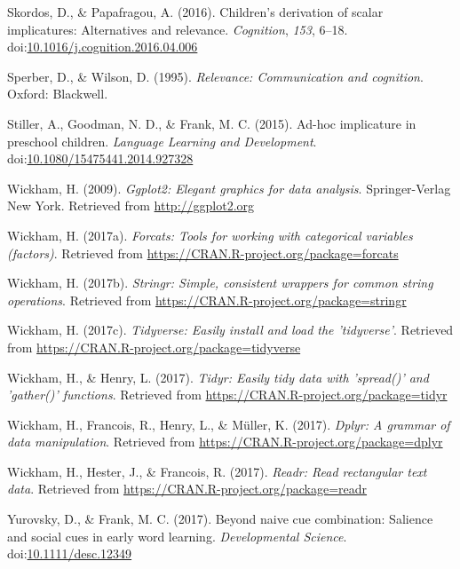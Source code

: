 \documentclass[man]{apa6}
\theoremstyle{definition}
\theoremstyle{definition}
\theoremstyle{definition}
\theoremstyle{remark}
\begin{document}
\hypertarget{ref-skordos2016}{}
Skordos, D., \& Papafragou, A. (2016). Children's derivation of scalar
implicatures: Alternatives and relevance. \emph{Cognition}, \emph{153},
6--18.
doi:\href{https://doi.org/10.1016/j.cognition.2016.04.006}{10.1016/j.cognition.2016.04.006}

\hypertarget{ref-sperber1986}{}
Sperber, D., \& Wilson, D. (1995). \emph{Relevance: Communication and
cognition}. Oxford: Blackwell.

\hypertarget{ref-stiller2015}{}
Stiller, A., Goodman, N. D., \& Frank, M. C. (2015). Ad-hoc implicature
in preschool children. \emph{Language Learning and Development}.
doi:\href{https://doi.org/10.1080/15475441.2014.927328}{10.1080/15475441.2014.927328}

\hypertarget{ref-R-ggplot2}{}
Wickham, H. (2009). \emph{Ggplot2: Elegant graphics for data analysis}.
Springer-Verlag New York. Retrieved from \url{http://ggplot2.org}

\hypertarget{ref-R-forcats}{}
Wickham, H. (2017a). \emph{Forcats: Tools for working with categorical
variables (factors)}. Retrieved from
\url{https://CRAN.R-project.org/package=forcats}

\hypertarget{ref-R-stringr}{}
Wickham, H. (2017b). \emph{Stringr: Simple, consistent wrappers for
common string operations}. Retrieved from
\url{https://CRAN.R-project.org/package=stringr}

\hypertarget{ref-R-tidyverse}{}
Wickham, H. (2017c). \emph{Tidyverse: Easily install and load the
'tidyverse'}. Retrieved from
\url{https://CRAN.R-project.org/package=tidyverse}

\hypertarget{ref-R-tidyr}{}
Wickham, H., \& Henry, L. (2017). \emph{Tidyr: Easily tidy data with
'spread()' and 'gather()' functions}. Retrieved from
\url{https://CRAN.R-project.org/package=tidyr}

\hypertarget{ref-R-dplyr}{}
Wickham, H., Francois, R., Henry, L., \& Müller, K. (2017). \emph{Dplyr:
A grammar of data manipulation}. Retrieved from
\url{https://CRAN.R-project.org/package=dplyr}

\hypertarget{ref-R-readr}{}
Wickham, H., Hester, J., \& Francois, R. (2017). \emph{Readr: Read
rectangular text data}. Retrieved from
\url{https://CRAN.R-project.org/package=readr}

\hypertarget{ref-yurovsky2017}{}
Yurovsky, D., \& Frank, M. C. (2017). Beyond naive cue combination:
Salience and social cues in early word learning. \emph{Developmental
Science}.
doi:\href{https://doi.org/10.1111/desc.12349}{10.1111/desc.12349}
\end{document}
